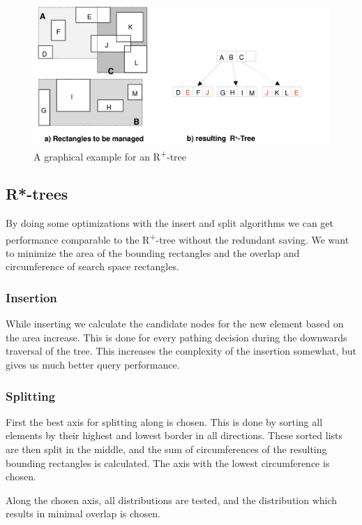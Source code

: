 \documentclass{article}
\begin{document}
\begin{figure}[h]
    \centering
    \includegraphics[width=\textwidth]{r+tree.png}
    \caption{A graphical example for an R\textsuperscript{+}-tree}
    \label{fig:r+-tree}
\end{figure}

\subsection{R*-trees}
By doing some optimizations with the insert and split algorithms we can get performance comparable to the R\textsuperscript{+}-tree without the redundant saving.
We want to minimize the area of the bounding rectangles and the overlap and circumference of search space rectangles.

\subsubsection{Insertion}
While inserting we calculate the candidate nodes for the new element based on the area increase.
This is done for every pathing decision during the downwards traversal of the tree.
This increases the complexity of the insertion somewhat, but gives us much better query performance.

\subsubsection{Splitting}
First the best axis for splitting along is chosen.
This is done by sorting all elements by their highest and lowest border in all directions.
These sorted lists are then split in the middle, and the sum of circumferences of the resulting bounding rectangles is calculated.
The axis with the lowest circumference is chosen.

Along the chosen axis, all distributions are tested, and the distribution which results in minimal overlap is chosen.
\end{document}
